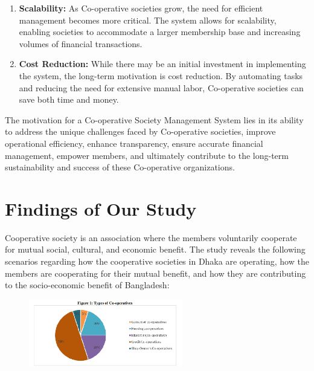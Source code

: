 \begin{enumerate}
    \item \textbf{Scalability:} As Co-operative societies grow, the need for efficient management becomes more critical. The system allows for scalability, enabling societies to accommodate a larger membership base and increasing volumes of financial transactions.
    
    \item \textbf{Cost Reduction:} While there may be an initial investment in implementing the system, the long-term motivation is cost reduction. By automating tasks and reducing the need for extensive manual labor, Co-operative societies can save both time and money.
\end{enumerate}

The motivation for a Co-operative Society Management System lies in its ability to address the unique challenges faced by Co-operative societies, improve operational efficiency, enhance transparency, ensure accurate financial management, empower members, and ultimately contribute to the long-term sustainability and success of these Co-operative organizations.




\section{Findings of Our Study}

Cooperative society is an association where the members voluntarily cooperate for mutual social, cultural, and economic benefit. The study reveals the following scenarios regarding how the cooperative societies in Dhaka are operating, how the members are cooperating for their mutual benefit, and how they are contributing to the socio-economic benefit of Bangladesh:

\begin{figure}[h]
    \centering
    \includegraphics[width=0.6\textwidth]{Chap1/figure1.PNG}
    \label{fig:example}
  \end{figure}

